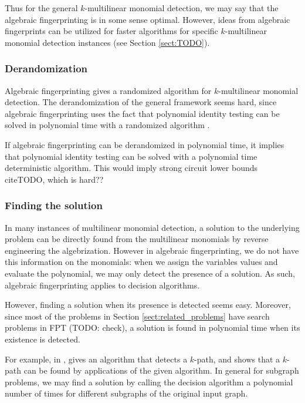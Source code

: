 Thus for the general $k$-multilinear monomial detection, we may say 
that the algebraic fingerprinting is in some sense optimal. 
However, 
ideas from algebraic fingerprints can be utilized for faster algorithms for 
specific $k$-multilinear monomial detection instances (see Section \ref{sect:TODO}).

\subsubsection{Derandomization}

Algebraic fingerprinting gives a randomized algorithm for $k$-multilinear monomial detection. 
The derandomization of the general framework seems hard, since algebraic fingerprinting 
uses the fact that polynomial identity testing can be solved in polynomial time with 
a randomized algorithm \cite{Williams09}.

If algebraic fingerprinting can be derandomized 
in polynomial time, it implies that polynomial identity testing can be solved with a 
polynomial time deterministic algorithm. This would imply strong circuit lower bounds \\cite{TODO}, 
which is hard??

\subsubsection{Finding the solution}
\label{sect:finding_the_solution}

In many instances of multilinear monomial detection, 
a solution to the underlying problem can be directly found 
from the multilinear monomials by reverse engineering the algebrization. 
However in algebraic fingerprinting, we do not have this information on the monomials: 
when we assign the variables values and evaluate the polynomial, we may only detect the 
presence of a solution. As such, algebraic fingerprinting applies to decision algorithms.

However, finding a solution when its presence is detected seems easy. 
Moreover, since most of the problems in Section \ref{sect:related_problems} 
have search problems in FPT (TODO: check), a solution is found in polynomial time when its 
existence is detected.

For example, in \cite{Koutis08}, 
\cite{Koutis08} gives an algorithm that detects a $k$-path, and shows that a 
$k$-path can be found by  applications of the given algorithm. 
In general for subgraph problems, we may find a solution by calling the decision 
algorithm a polynomial number of times for different subgraphs of the original input graph.

